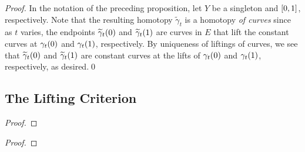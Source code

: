 \documentclass[../Moduli_Spaces_of_Riemann_Surfaces.tex]{subfiles}
\begin{document}
    \begin{proof}
        In the notation of the preceding proposition, let $Y$ be a singleton and $\left[0,1\right]$, respectively. Note that the resulting homotopy $\widetilde{\gamma}_t$ is a homotopy \textit{of curves} since as $t$ varies, the endpoints $\widetilde{\gamma}_t\!\left(0\right)$ and $\widetilde{\gamma}_t\!\left(1\right)$ are curves in $E$ that lift the constant curves at $\gamma_t\!\left(0\right)$ and $\gamma_t\!\left(1\right)$, respectively. By uniqueness of liftings of curves, we see that $\widetilde{\gamma}_t\!\left(0\right)$ and $\widetilde{\gamma}_t\!\left(1\right)$ are constant curves at the lifts of $\gamma_t\!\left(0\right)$ and $\gamma_t\!\left(1\right)$, respectively, as desired.\qed
    \end{proof}
    \subsection{The Lifting Criterion}
    \begin{lemma}
        
    \end{lemma}
    \begin{proof}
        
    \end{proof}
    \begin{proposition}
        
    \end{proposition}
    \begin{proof}
        
    \end{proof}
\end{document}
